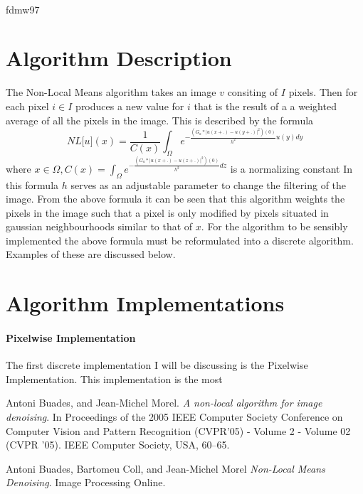 \documentclass[11pt,letterpaper]{article}
\begin{document}
\vspace*{0.2in}

\begin{flushleft}
{\Large
\textbf{}
}
\newline

\\
fdmw97
\\
\bigskip

\end{flushleft}

\section*{Algorithm Description}
The Non-Local Means algorithm takes an image $v$ consiting of $I$ pixels. Then for each pixel $i \in I$ produces a new value for $i$ that is the result of a a weighted average of all the pixels in the image. This is described by the formula
$$\mathit{NL}[\mathit{u](x)} = \frac{1}{\mathit{C(x)}}\int_{\Omega}^{}\mathit{e^{-\frac{(G_{a}*|u(x+.)-u(y+.)|^{2})(0)}{h^{2}}u(y) dy}}$$
where $\mathit{x \in \Omega, C(x) = \int_{\Omega}^{}e^{-\frac{(G_{a}*|u(x+.)-u(z+.)|^{2})(0)}{h^{2}}dz}}$ is a normalizing constant\cite{paper1}
In this formula $h$ serves as an adjustable parameter to change the filtering of the image. From the above formula it can be seen that this algorithm weights the pixels in the image such that a pixel is only modified by pixels situated in gaussian neighbourhoods similar to that of $x$.
For the algorithm to be sensibly implemented the above formula must be reformulated into a discrete algorithm. Examples of these are discussed below.

\section*{Algorithm Implementations}
\paragraph{Pixelwise Implementation}
The first discrete implementation I will be discussing is the Pixelwise Implementation. This implementation is the most 
\begin{thebibliography}{9}
Antoni Buades, and Jean-Michel Morel.
\textit{A non-local algorithm for image denoising}.
In Proceedings of the 2005 IEEE Computer Society Conference on Computer Vision and Pattern Recognition (CVPR’05) - Volume 2 - Volume 02 (CVPR ’05). IEEE Computer Society, USA, 60–65.

Antoni Buades, Bartomeu Coll, and Jean-Michel Morel
\textit{Non-Local Means Denoising}.
Image Processing Online.


\end{thebibliography}
\end{document}
